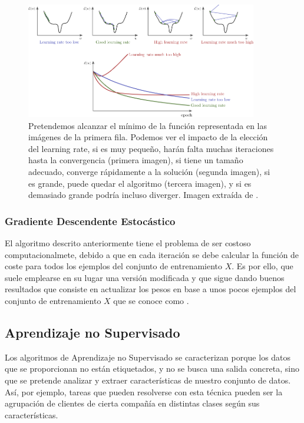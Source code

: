            \begin{figure}[!h]
                \centering
                \includegraphics[width=0.9\textwidth]{img/lr-types.png}
                \caption{Pretendemos alcanzar el mínimo de la función representada en las imágenes de la primera fila. Podemos ver el impacto de la elección del learning rate, si es muy pequeño, harán falta muchas iteraciones hasta la convergencia (primera imagen), si tiene un tamaño adecuado, converge rápidamente a la solución (segunda imagen), si es grande, puede quedar  el algoritmo (tercera imagen), y si es demasiado grande podría incluso diverger. Imagen extraída de \cite{StanfordCourse}.}
                \label{fig:learning_rate}
            \end{figure}
            
    
        \subsubsection{Gradiente Descendente Estocástico}
    
            \noindent El algoritmo descrito anteriormente tiene el problema de ser costoso computacionalmete, debido a que en cada iteración se debe calcular la función de coste para todos los ejemplos del conjunto de entrenamiento $X$. Es por ello, que suele emplearse en su lugar una versión modificada y que sigue dando buenos resultados que consiste en actualizar los pesos en base a unos pocos ejemplos del conjunto de entrenamiento $X$ que se conoce como .
        
    \subsection{Aprendizaje no Supervisado}
        \noindent Los algoritmos de Aprendizaje no Supervisado se caracterizan porque los datos que se proporcionan no están etiquetados, y no se busca una salida concreta, sino que se pretende analizar y extraer características de nuestro conjunto de datos. Así, por ejemplo, tareas que pueden resolverse con esta técnica pueden ser la agrupación de clientes de cierta compañía en distintas clases según sus características.
    
